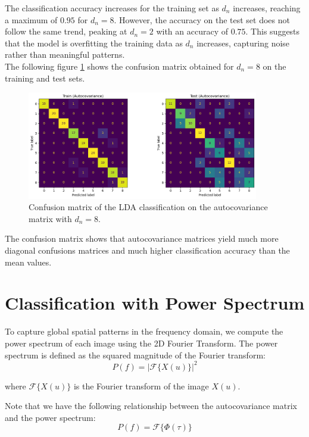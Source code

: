 \documentclass[12pt,a4paper]{article}
\begin{document}
The classification accuracy increases for the training set as $d_n$ increases, reaching a maximum of $0.95$ for $d_n = 8$.
However, the accuracy on the test set does not follow the same trend, peaking at $d_n = 2$ with an accuracy of $0.75$.
This suggests that the model is overfitting the training data as $d_n$ increases, capturing noise rather than meaningful patterns. \\

The following figure \ref{fig:confusion_matrix_dn} shows the confusion matrix obtained for $d_n = 8$ on the training and test sets.
\begin{figure}[H]
    \centering
    \includegraphics[width=0.9\textwidth]{src/confusion_matrix_dn.png}
    \caption{Confusion matrix of the LDA classification on the autocovariance matrix with $d_n = 8$.}
    \label{fig:confusion_matrix_dn}
\end{figure}

The confusion matrix shows that autocovariance matrices yield much more diagonal confusions matrices and much higher classification accuracy than the mean values.


\section{Classification with Power Spectrum}

To capture global spatial patterns in the frequency domain, we compute the power spectrum of each image using the 2D Fourier Transform.
The power spectrum is defined as the squared magnitude of the Fourier transform:
\begin{equation}
    P(f) = |\mathcal{F}\{X(u)\}|^2
\end{equation}

where $\mathcal{F}\{X(u)\}$ is the Fourier transform of the image $X(u)$.

Note that we have the following relationship between the autocovariance matrix and the power spectrum:
\begin{equation}
    P(f) = \mathcal{F}\{\Phi(\tau)\}
\end{equation}
\end{document}
